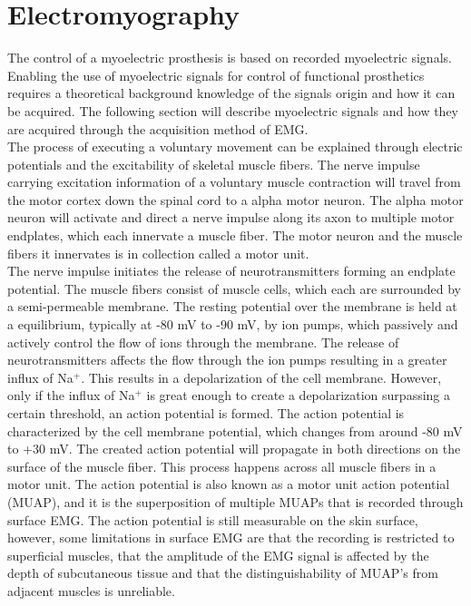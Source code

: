 \section{Electromyography}

The control of a myoelectric prosthesis is based on recorded myoelectric signals. \cite{Geethanjali2016}  Enabling the use of myoelectric signals for control of functional prosthetics requires a theoretical background knowledge of the signals origin and how it can be acquired. The following section will describe myoelectric signals and how they are acquired through the acquisition method of EMG.   \\
The process of executing a voluntary movement can be explained through electric potentials and the excitability of skeletal muscle fibers. The nerve impulse carrying excitation information of a voluntary muscle contraction will travel from the motor cortex down the spinal cord to a alpha motor neuron. The alpha motor neuron will activate and direct a nerve impulse along its axon to multiple motor endplates, which each innervate a muscle fiber. The motor neuron and the muscle fibers it innervates is in collection called a motor unit. \cite{Turker2013} \\
The nerve impulse initiates the release of neurotransmitters forming an endplate potential. The muscle fibers consist of muscle cells, which each are surrounded by a semi-permeable membrane. The resting potential over the membrane is held at a equilibrium, typically at -80 mV to -90 mV, by ion pumps, which passively and actively control the flow of ions through the membrane. The release of neurotransmitters affects the flow through the ion pumps resulting in a greater influx of Na$^+$. This results in a depolarization of the cell membrane. However, only if the influx of Na$^+$ is great enough to create a depolarization surpassing a certain threshold, an action potential is formed. The action potential is characterized by the cell membrane potential, which changes from around -80 mV to +30 mV. %
The created action potential will propagate in both directions on the surface of the muscle fiber. This process happens across all muscle fibers in a motor unit. The action potential is also known as a motor unit action potential (MUAP), and it is the superposition of multiple MUAPs that is recorded through surface EMG. The action potential is still measurable on the skin surface, however, some limitations in surface EMG are that the recording is restricted to superficial muscles, that the amplitude of the EMG signal is affected by the depth of subcutaneous tissue and that the distinguishability of MUAP's from adjacent muscles is unreliable. \cite{Turker2013,Martini2012} \\
